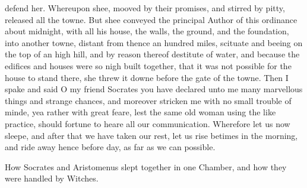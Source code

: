 defend her. Whereupon shee, mooved by their promises, and stirred by pitty,
released all the towne. But shee conveyed the principal Author of this
ordinance about midnight, with all his house, the walls, the ground, and the
foundation, into another towne, distant from thence an hundred miles, scituate
and beeing on the top of an high hill, and by reason thereof destitute of
water, and because the edifices and houses were so nigh built together, that it
was not possible for the house to stand there, she threw it downe before the
gate of the towne. Then I spake and said O my friend Socrates you have declared
unto me many marvellous things and strange chances, and moreover stricken me
with no small trouble of minde, yea rather with great feare, lest the same old
woman using the like practice, should fortune to heare all our communication.
Wherefore let us now sleepe, and after that we have taken our rest, let us rise
betimes in the morning, and ride away hence before day, as far as we can
possible.


How Socrates and Aristomenus slept together in one Chamber, and how they were
handled by Witches.

